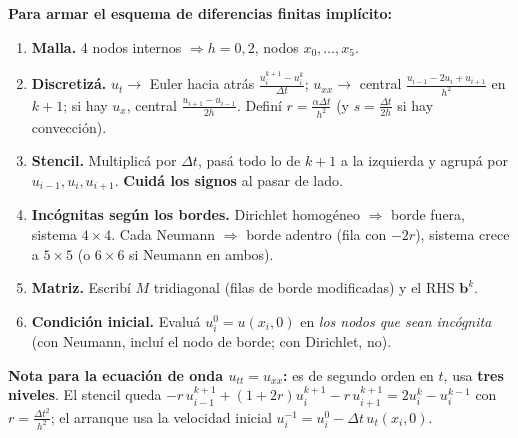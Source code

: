 \begin{receta}
\textbf{Para armar el esquema de diferencias finitas implícito:}
\begin{enumerate}
\item \textbf{Malla.} 4 nodos internos $\Rightarrow h=0{,}2$, nodos $x_0,\dots,x_5$.
\item \textbf{Discretizá.} $u_t\to$ Euler hacia atrás $\tfrac{u_i^{k+1}-u_i^k}{\Delta t}$; $u_{xx}\to$ central $\tfrac{u_{i-1}-2u_i+u_{i+1}}{h^2}$ en $k+1$; si hay $u_x$, central $\tfrac{u_{i+1}-u_{i-1}}{2h}$. Definí $r=\tfrac{\alpha\Delta t}{h^2}$ (y $s=\tfrac{\Delta t}{2h}$ si hay convección).
\item \textbf{Stencil.} Multiplicá por $\Delta t$, pasá todo lo de $k+1$ a la izquierda y agrupá por $u_{i-1},u_i,u_{i+1}$. \textbf{Cuidá los signos} al pasar de lado.
\item \textbf{Incógnitas según los bordes.} Dirichlet homogéneo $\Rightarrow$ borde fuera, sistema $4\times4$. Cada Neumann $\Rightarrow$ borde adentro (fila con $-2r$), sistema crece a $5\times5$ (o $6\times6$ si Neumann en ambos).
\item \textbf{Matriz.} Escribí $M$ tridiagonal (filas de borde modificadas) y el RHS $\mathbf b^k$.
\item \textbf{Condición inicial.} Evaluá $u_i^0=u(x_i,0)$ en \emph{los nodos que sean incógnita} (con Neumann, incluí el nodo de borde; con Dirichlet, no).
\end{enumerate}
\textbf{Nota para la ecuación de onda $u_{tt}=u_{xx}$:} es de segundo orden en $t$, usa \textbf{tres niveles}. El stencil queda $-r\,u_{i-1}^{k+1}+(1+2r)u_i^{k+1}-r\,u_{i+1}^{k+1}=2u_i^{k}-u_i^{k-1}$ con $r=\tfrac{\Delta t^2}{h^2}$; el arranque usa la velocidad inicial $u_i^{-1}=u_i^0-\Delta t\,u_t(x_i,0)$.
\end{receta}

